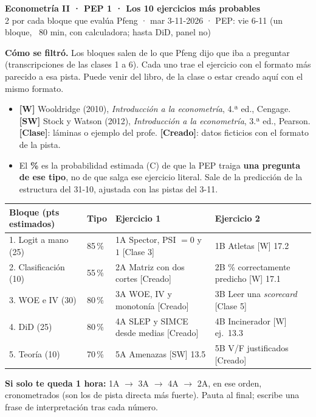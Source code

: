 \documentclass[11pt]{article}
\newcommand{\prob}[1]{\colorbox{red!15}{\textbf{#1}}}
\begin{document}
{\Large\textbf{Econometría II · PEP 1 · Los 10 ejercicios más probables}}\\[2pt]
2 por cada bloque que evalúa Pfeng · mar 3-11-2026 · PEP: vie 6-11 (un bloque, ~80 min, con calculadora; hasta DiD, panel no)

\begin{tcolorbox}[colback=black!3,colframe=black!40,boxrule=0.4pt]
\small
\textbf{Cómo se filtró.} Los bloques salen de lo que Pfeng dijo que iba a preguntar (transcripciones de las clases 1 a 6). Cada uno trae el ejercicio con el formato más parecido a esa pista. Puede venir del libro, de la clase o estar creado aquí con el mismo formato.
\begin{itemize}[itemsep=0pt,topsep=2pt]
\item \textbf{[W]} Wooldridge (2010), \emph{Introducción a la econometría}, 4.ª ed., Cengage. \textbf{[SW]} Stock y Watson (2012), \emph{Introducción a la econometría}, 3.ª ed., Pearson. \textbf{[Clase]}: láminas o ejemplo del profe. \textbf{[Creado]}: datos ficticios con el formato de la pista.
\item El \prob{\%} es la probabilidad estimada (C) de que la PEP traiga \textbf{una pregunta de ese tipo}, no de que salga ese ejercicio literal. Sale de la predicción de la estructura del 31-10, ajustada con las pistas del 3-11.
\end{itemize}
\end{tcolorbox}

\begin{center}\small
\begin{tabular}{p{3.6cm}p{1.3cm}p{5.4cm}p{5.4cm}}
\toprule
\textbf{Bloque (pts estimados)} & \textbf{Tipo} & \textbf{Ejercicio 1} & \textbf{Ejercicio 2}\\\midrule
1. Logit a mano (25) & 85\,\% & 1A Spector, PSI $=0$ y $1$ [Clase 3] & 1B Atletas [W] 17.2\\
2. Clasificación (10) & 55\,\% & 2A Matriz con dos cortes [Creado] & 2B \% correctamente predicho [W] 17.1\\
3. WOE e IV (30) & 80\,\% & 3A WOE, IV y monotonía [Creado] & 3B Leer una \emph{scorecard} [Clase 5]\\
4. DiD (25) & 80\,\% & 4A SLEP y SIMCE desde medias [Creado] & 4B Incinerador [W] ej.~13.3\\
5. Teoría (10) & 70\,\% & 5A Amenazas [SW] 13.5 & 5B V/F justificados [Creado]\\\bottomrule
\end{tabular}
\end{center}
\textbf{Si solo te queda 1 hora:} 1A $\to$ 3A $\to$ 4A $\to$ 2A, en ese orden, cronometrados (son los de pista directa más fuerte). Pauta al final; escribe una frase de interpretación tras cada número.
\end{document}
